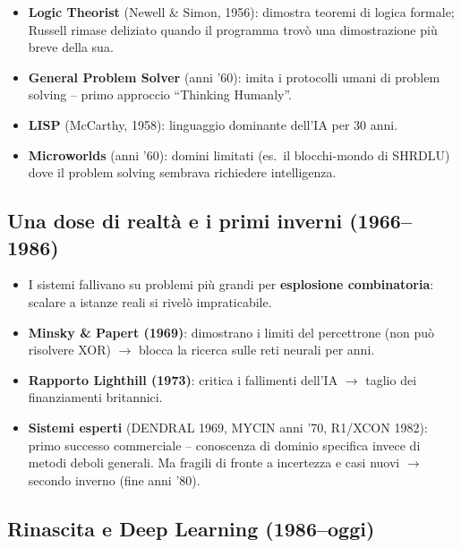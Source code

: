 \begin{itemize}
    \item \textbf{Logic Theorist} (Newell \& Simon, 1956): dimostra teoremi di logica formale; Russell rimase deliziato quando il programma trov\`o una dimostrazione pi\`u breve della sua.
    \item \textbf{General Problem Solver} (anni '60): imita i protocolli umani di problem solving -- primo approccio ``Thinking Humanly''.
    \item \textbf{LISP} (McCarthy, 1958): linguaggio dominante dell'IA per 30 anni.
    \item \textbf{Microworlds} (anni '60): domini limitati (es.\ il blocchi-mondo di SHRDLU) dove il problem solving sembrava richiedere intelligenza.
\end{itemize}

\subsection{Una dose di realt\`a e i primi inverni (1966--1986)}

\begin{itemize}
    \item I sistemi fallivano su problemi pi\`u grandi per \textbf{esplosione combinatoria}: scalare a istanze reali si rivel\`o impraticabile.
    \item \textbf{Minsky \& Papert (1969)}: dimostrano i limiti del percettrone (non pu\`o risolvere XOR) $\to$ blocca la ricerca sulle reti neurali per anni.
    \item \textbf{Rapporto Lighthill (1973)}: critica i fallimenti dell'IA $\to$ taglio dei finanziamenti britannici.
    \item \textbf{Sistemi esperti} (DENDRAL 1969, MYCIN anni '70, R1/XCON 1982): primo successo commerciale -- conoscenza di dominio specifica invece di metodi deboli generali. Ma fragili di fronte a incertezza e casi nuovi $\to$ secondo inverno (fine anni '80).
\end{itemize}

\subsection{Rinascita e Deep Learning (1986--oggi)}

